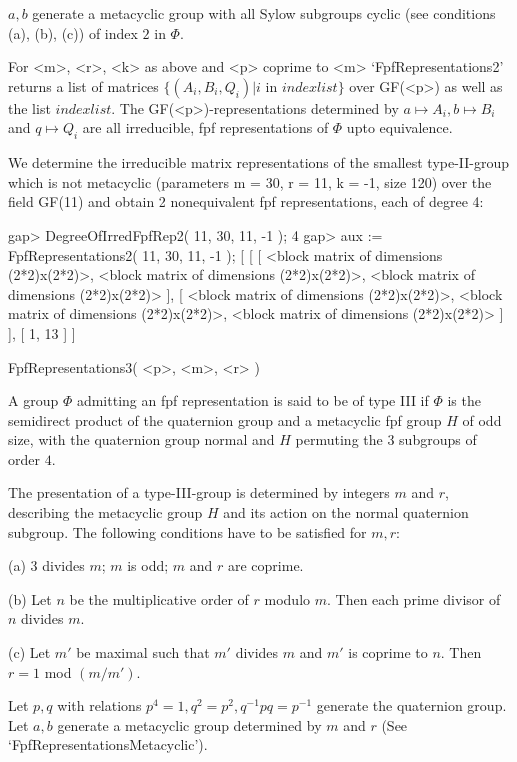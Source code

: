  $a,b$ generate a metacyclic group with all Sylow subgroups cyclic
 (see conditions (a), (b), (c)) of index $2$ in $\Phi$.

For <m>, <r>, <k> as above and <p> coprime to <m>
`FpfRepresentations2'
returns a list of matrices $\{ (A_i,B_i,Q_i) | i$ in $indexlist \}$ over
GF(<p>) as well as the list $indexlist$. The GF(<p>)-representations
determined by $a \mapsto A_i, b \mapsto B_i$ and $q \mapsto Q_i$ are all
irreducible, fpf representations of $\Phi$ upto equivalence.

We determine the irreducible matrix representations of the smallest
type-II-group which is not metacyclic (parameters m = 30, r = 11, k = -1,
size 120) over the field GF(11) and obtain 2 nonequivalent fpf representations,
each of degree 4:

\beginexample
    gap> DegreeOfIrredFpfRep2( 11, 30, 11, -1 );
    4
    gap> aux := FpfRepresentations2( 11, 30, 11, -1 );
    [ [ [ <block matrix of dimensions (2*2)x(2*2)>, 
              <block matrix of dimensions (2*2)x(2*2)>, 
              <block matrix of dimensions (2*2)x(2*2)> ], 
          [ <block matrix of dimensions (2*2)x(2*2)>, 
              <block matrix of dimensions (2*2)x(2*2)>, 
              <block matrix of dimensions (2*2)x(2*2)> ] ], [ 1, 13 ] ]
\endexample

\>FpfRepresentations3( <p>, <m>, <r> )

 A group $\Phi$ admitting an fpf representation is said to be of
 type III if $\Phi$ is the semidirect product of the quaternion group 
 and a metacyclic fpf group $H$ of odd size, with the quaternion
 group normal and $H$ permuting the $3$ subgroups of order $4$.   

 The presentation of a type-III-group is determined by integers $m$ and $r$,
 describing the metacyclic group $H$ and its action on the normal quaternion
 subgroup. The following conditions have to be satisfied for $m,r$:

\beginlist
\item{(a)} $3$ divides $m$; $m$ is odd; $m$ and $r$ are coprime.
\item{(b)} Let $n$ be the multiplicative order of $r$ modulo $m$.
 Then each prime divisor of $n$ divides $m$.
\item{(c)} Let $m'$ be maximal such that $m'$ divides $m$ and $m'$ is coprime
 to $n$. Then $r = 1$ mod $(m/m')$.
\endlist

 Let $p,q$ with relations $p^4 = 1, q^2 = p^2, q^{-1}pq = p^{-1}$ generate
 the quaternion group. Let $a,b$ generate a metacyclic group
 determined by $m$ and $r$ (See `FpfRepresentationsMetacyclic'). 

